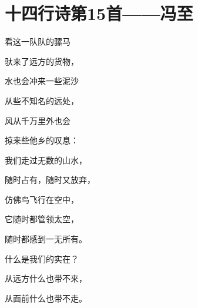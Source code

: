 \section{十四行诗第15首——冯至}

看这一队队的骡马

驮来了远方的货物，

水也会冲来一些泥沙

从些不知名的远处，

风从千万里外也会

掠来些他乡的叹息：

我们走过无数的山水，

随时占有，随时又放弃，

仿佛鸟飞行在空中，

它随时都管领太空，

随时都感到一无所有。

什么是我们的实在？

从远方什么也带不来，

从面前什么也带不走。